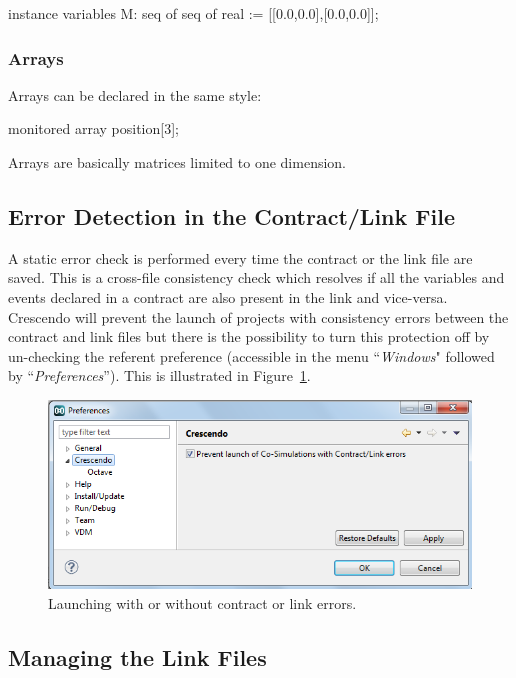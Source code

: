 \documentclass{crescendorepchap}
\begin{document}
\begin{vdmrt}
instance variables
    M: seq of seq of real := [[0.0,0.0],[0.0,0.0]];
\end{vdmrt}

\subsubsection{Arrays}

Arrays can be declared in the same style:

\begin{dcl}
monitored array position[3];
\end{dcl}

\noindent Arrays are basically matrices limited to one dimension.

\subsection{Error Detection in the Contract/Link File}

A static error check is performed every time the contract or the
link file are saved. This is a cross-file consistency check which resolves if all the variables and events
declared in a contract are also present in the link and vice-versa.
Crescendo will prevent the launch of projects with consistency errors
between the contract and link files but there is the possibility to turn
this protection off by un-checking the referent preference (accessible
in the menu ``\emph{Windows}" followed by ``\emph{Preferences}''). This is illustrated in Figure~\ref{fig:linkerrors}.

\begin{figure}[htbp]
\centering
\includegraphics[width=.8\textwidth]{images/DestecsPreferences.png}
\caption{Launching with or without contract or link errors.\label{fig:linkerrors}}
\end{figure}

\subsection{Managing the Link Files}
\end{document}
